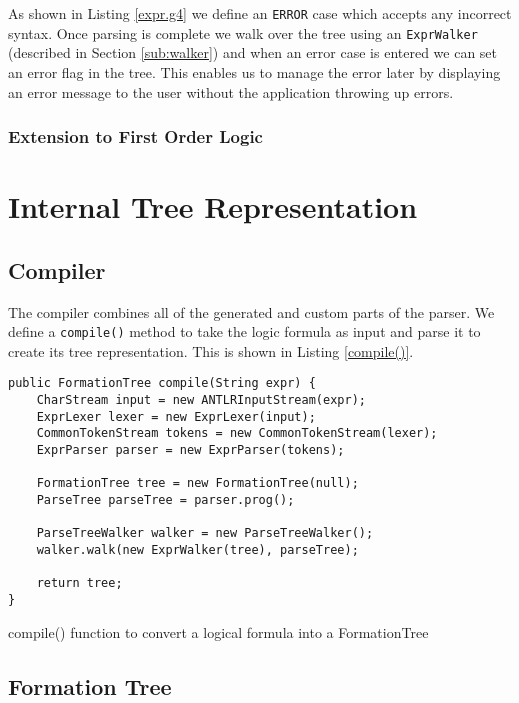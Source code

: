 \documentclass{report}
\begin{document}
As shown in Listing \ref{expr.g4} we define an {\tt ERROR} case which accepts any incorrect syntax. Once parsing is complete we walk over the tree using an {\tt ExprWalker} (described in Section \ref{sub:walker}) and when an error case is entered we can set an error flag in the tree. This enables us to manage the error later by displaying an error message to the user without the application throwing up errors.

\subsection{Extension to First Order Logic}

\chapter{Internal Tree Representation}
\label{chap:internal_tree_representation}

\section{Compiler}
\label{sec:compiler}

The compiler combines all of the generated and custom parts of the parser. We define a {\tt compile()} method to take the logic formula as input and parse it to create its tree representation. This is shown in Listing \ref{compile()}.

\begin{listing}[ht]
\begin{verbatim}
public FormationTree compile(String expr) {
    CharStream input = new ANTLRInputStream(expr);
    ExprLexer lexer = new ExprLexer(input);
    CommonTokenStream tokens = new CommonTokenStream(lexer);
    ExprParser parser = new ExprParser(tokens);
    
    FormationTree tree = new FormationTree(null);
    ParseTree parseTree = parser.prog();
    
    ParseTreeWalker walker = new ParseTreeWalker();
    walker.walk(new ExprWalker(tree), parseTree);

    return tree;
}
\end{verbatim}
\caption{compile() function to convert a logical formula into a FormationTree}
\label{compile()}
\end{listing}

\section{Formation Tree}
\label{sec:formation_tree}
\end{document}
